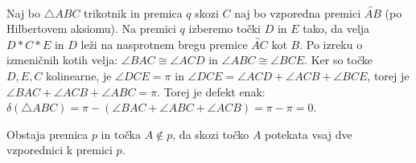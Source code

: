 \begin{dokaz}
            \\ Naj bo $\triangle ABC$ trikotnik in premica $q$ skozi $C$ naj bo vzporedna premici $\overleftrightarrow{AB}$ (po Hilbertovem aksiomu). Na premici $q$ izberemo točki $D$ in $E$ tako, da velja $D\ast C\ast E$ in $D$ leži na nasprotnem bregu premice $\overleftrightarrow{AC}$ kot $B$. Po izreku o izmeničnih kotih velja: $\angle BAC\cong\angle ACD$ in $\angle ABC\cong\angle BCE$. Ker so točke $D, E, C$ kolinearne, je $\angle DCE =\pi$ in $\angle DCE=\angle ACD + \angle ACB + \angle BCE$, torej je $\angle BAC + \angle ACB + \angle ABC = \pi$. Torej je defekt enak: $\delta(\triangle ABC)= \pi-(\angle BAC + \angle ABC + \angle ACB)=\pi - \pi = 0$.
        \end{dokaz}

    \begin{aksiom}
        Obstaja premica $p$ in točka $A\notin p$, da skozi točko $A$ potekata vsaj dve vzporednici k premici $p$.
    \end{aksiom}

